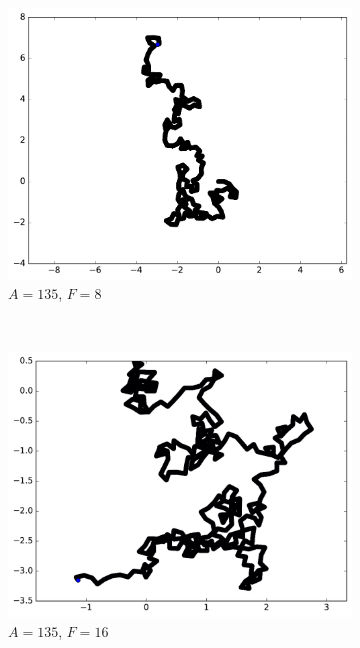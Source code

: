 \begin{appendices}
\begin{figure}[htbp]
\begin{subfigure}[t]{\subImgWmo}
			\centering
			\includegraphics[width=\textwidth]{figures/ch3/synTraj_219_135_8}
			\caption[$A = 135$, $F=8$]{$A = 135$, $F=8$}
			\label{fig:synTraj_219_135_8}
		\end{subfigure}
		~
		\begin{subfigure}[t]{\subImgWmo}
			\centering
			\includegraphics[width=\textwidth]{figures/ch3/synTraj_219_135_16}
			\caption[$A = 135$, $F=16$]{$A = 135$, $F=16$}
			\label{fig:synTraj_219_135_16}
		\end{subfigure}
		~
		\begin{subfigure}[t]{\subImgWmo}
			\centering

\end{subfigure}
\end{figure}
\end{appendices}
